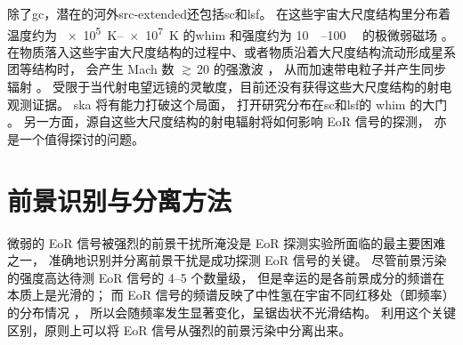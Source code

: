 除了\ac{gc}，潜在的河外\ac{src-extended}还包括\ac{sc}和\ac{lsf}。
在这些宇宙大尺度结构里分布着温度约为 \SIrange{e5}{e7}{\kelvin} 的\ac{whim}
和强度约为 \SIrange{10}{100}{\nano\gauss} 的极微弱磁场 \cite{vazza2014}。
在物质落入这些宇宙大尺度结构的过程中、或者物质沿着大尺度结构流动形成星系团等结构时，
会产生 Mach 数 $\gtrsim$\,20 的强激波 \cite{ryu2003,skillman2008}，
从而加速带电粒子并产生同步辐射 \cite{vazza2015}。
受限于当代射电望远镜的灵敏度，目前还没有获得这些大尺度结构的射电观测证据。
\ac{ska} 将有能力打破这个局面，
打开研究分布在\ac{sc}和\ac{lsf}的 \ac{whim} 的大门 \cite{vazza2015}。
另一方面，源自这些大尺度结构的射电辐射将如何影响 EoR 信号的探测，
亦是一个值得探讨的问题。


\section{前景识别与分离方法}
\label{sec:fg-methods}

微弱的 EoR 信号被强烈的前景干扰所淹没是 EoR 探测实验所面临的最主要困难之一，
准确地识别并分离前景干扰是成功探测 EoR 信号的关键。
尽管前景污染的强度高达待测 EoR 信号的 \numrange{4}{5} 个数量级，
但是幸运的是各前景成分的频谱在本质上是光滑的；
而 EoR 信号的频谱反映了中性氢在宇宙不同红移处（即频率）的分布情况
\cite{diMatteo2002,oh2003,gnedin2004}，
所以会随频率发生显著变化，呈锯齿状不光滑结构。
利用这个关键区别，原则上可以将 EoR 信号从强烈的前景污染中分离出来。

